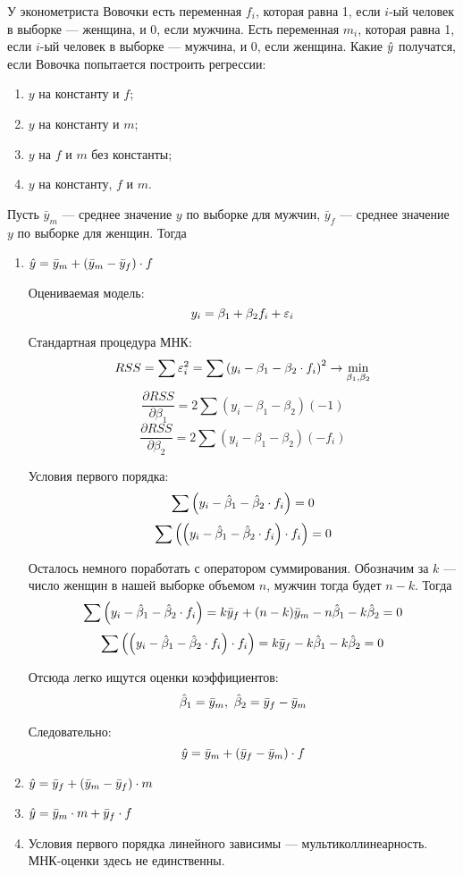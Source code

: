 \begin{problem} %
У эконометриста Вовочки есть переменная $f_i$, которая равна 1, если $i$-ый человек в выборке — женщина, и 0, если мужчина. Есть переменная $m_i$, которая равна 1, если $i$-ый человек в выборке — мужчина, и 0, если женщина. Какие $\hat{y}$ получатся, если Вовочка попытается построить регрессии:
\begin{enumerate}
\item $y$ на константу и $f$;
\item $y$ на константу и $m$;
\item $y$ на $f$ и $m$ без константы;
\item $y$ на константу, $f$ и $m$.
\end{enumerate}


\begin{sol}
Пусть \(\bar{y}_m\) — среднее значение \(y\) по выборке для мужчин, \(\bar{y}_f\) — среднее значение \(y\) по выборке для женщин. Тогда

\begin{enumerate}
\item \(\hat{y} = \bar{y}_m + \left( \bar{y}_m -  \bar{y}_f \right) \cdot f \)

Оцениваемая модель:
\[
y_i = \beta_1 + \beta_2 f_i + \varepsilon_i 
\]

Стандартная процедура МНК:
\[RSS = \sum \varepsilon_i^2 = \sum \left(y_i - \beta_1 - \beta_2 \cdot f_i \right)^2 \rightarrow \min \limits_{\beta_1, \beta_2}\]
\[\frac{\partial RSS}{\partial \beta_1} = 2 \sum \left(y_i - \beta_1 - \beta_2\right)(-1) \]
\[\frac{\partial RSS}{\partial \beta_2} = 2 \sum \left(y_i - \beta_1 - \beta_2 \right)(-f_i) \]

Условия первого порядка:
\[\sum \left(y_i - \hat{\beta}_1 - \hat{\beta}_2 \cdot f_i\right) = 0\]
\[\sum \left(\left(y_i - \hat{\beta}_1 - \hat{\beta}_2 \cdot f_i\right)\cdot f_i\right)= 0\]

Осталось немного поработать с оператором суммирования. Обозначим за \(k\) — число женщин в нашей выборке объемом \(n\), мужчин тогда будет \(n - k\). Тогда
\[\sum \left(y_i - \hat{\beta}_1 - \hat{\beta}_2 \cdot f_i\right) = k \bar{y}_f + (n - k) \bar{y}_m - n \hat{\beta}_1 - k \hat{\beta}_2 = 0\]
\[\sum \left(\left(y_i - \hat{\beta}_1 - \hat{\beta}_2 \cdot f_i\right)\cdot f_i\right) = k \bar{y}_f - k \hat{\beta}_1 - k \hat{\beta}_2 =0\]

Отсюда легко ищутся оценки коэффициентов:
\[\hat{\beta}_1 = \bar{y}_m, \ \hat{\beta}_2 = \bar{y}_f - \bar{y}_m  \]

Следовательно:
\[\hat{y} = \bar{y}_m + \left( \bar{y}_f -  \bar{y}_m \right) \cdot f \]

\item \(\hat{y} = \bar{y}_f + \left( \bar{y}_m -  \bar{y}_f \right) \cdot m \)

\item \(\hat{y} = \bar{y}_m \cdot m + \bar{y}_f \cdot f \)

\item Условия первого порядка линейного зависимы — мультиколлинеарность. МНК-оценки здесь не единственны.
\end{enumerate}
\end{sol}
\end{problem}




